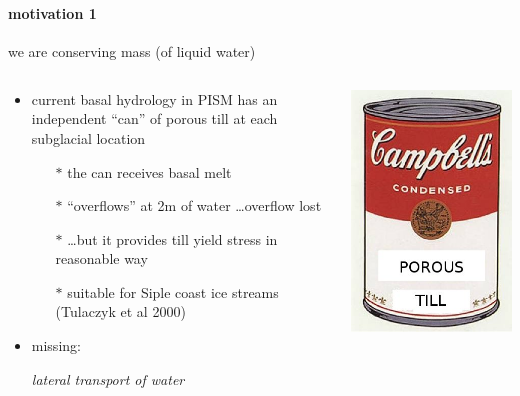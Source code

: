 \documentclass[hide notes,intlimits]{beamer}
\begin{document}
\begin{frame}
  \frametitle{\whytitle}
  \framesubtitle{motivation 1}

\vspace{-6mm}
\begin{center}
  we are  conserving mass (of liquid water)
\end{center}

\vspace{-5mm}
\begin{columns}
\begin{column}{0.5\textwidth}
  \begin{itemize}
    \item current basal hydrology in PISM has an independent ``can'' of porous till at each subglacial location %
      \begin{itemize}
        \item[$\ast$] the can receives basal melt
        \item[$\ast$] ``overflows'' at 2m of water \dots overflow lost
        \item[$\ast$] \dots but it provides till yield stress in reasonable way
        \item[$\ast$] suitable for Siple coast ice streams (Tulaczyk et al 2000) %
      \end{itemize}
    \item missing:
    
      \begin{center} \emph{lateral transport of water} \end{center}
  \end{itemize}
\end{column}
\begin{column}{0.5\textwidth}
\begin{center}
\includegraphics[height=0.3\textheight]{figs/till-warhol-soup}


\end{center}
\end{column}
\end{columns}
\end{frame}
\end{document}
